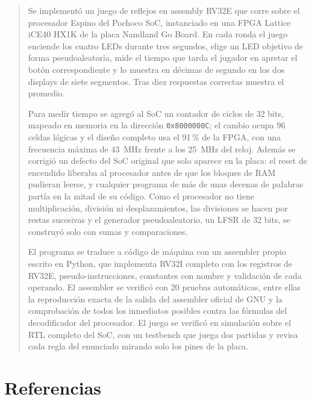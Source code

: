 \documentclass[11pt,letterpaper]{article}
\newcommand{\code}[1]{\texttt{#1}}
\begin{document}
\marginsize{2.5cm}{2cm}{0.8cm}{2cm}
\newpage
\begin{abstract}
Se implementó un juego de reflejos en assembly RV32E que corre sobre el procesador
Espino del Pochoco SoC, instanciado en una FPGA Lattice iCE40 HX1K de la placa Nandland
Go Board. En cada ronda el juego enciende los cuatro LEDs durante tres segundos, elige
un LED objetivo de forma pseudoaleatoria, mide el tiempo que tarda el jugador en
apretar el botón correspondiente y lo muestra en décimas de segundo en los dos displays
de siete segmentos. Tras diez respuestas correctas muestra el promedio.

Para medir tiempo se agregó al SoC un contador de ciclos de 32 bits, mapeado en memoria
en la dirección \code{0x8000000C}; el cambio ocupa 96 celdas lógicas y el diseño
completo usa el 91\,\% de la FPGA, con una frecuencia máxima de 43~MHz frente a los
25~MHz del reloj. Además se corrigió un defecto del SoC original que solo aparece en la
placa: el reset de encendido liberaba al procesador antes de que los bloques de RAM
pudieran leerse, y cualquier programa de más de unas decenas de palabras partía en la
mitad de su código. Como el procesador no tiene multiplicación, división ni
desplazamientos, las divisiones se hacen por restas sucesivas y el generador
pseudoaleatorio, un LFSR de 32 bits, se construyó solo con sumas y comparaciones.

El programa se traduce a código de máquina con un assembler propio escrito en Python,
que implementa RV32I completo con los registros de RV32E, pseudo-instrucciones,
constantes con nombre y validación de cada operando. El assembler se verificó con
20 pruebas automáticas, entre ellas la reproducción exacta de la salida del assembler
oficial de GNU y la comprobación de todos los inmediatos posibles contra las fórmulas
del decodificador del procesador. El juego se verificó en simulación sobre el RTL
completo del SoC, con un testbench que juega dos partidas y revisa cada regla del
enunciado mirando solo los pines de la placa.
\end{abstract}

\newpage
\tableofcontents
\newpage










\newpage
\section*{Referencias}
\printbibliography[heading=none]

\newpage
\appendix


\newpage

\end{document}
